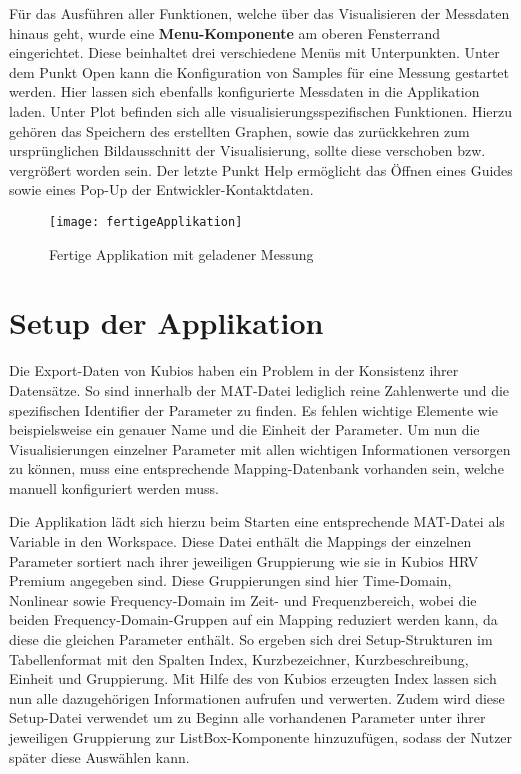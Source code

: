 Für das Ausführen aller Funktionen, welche über das Visualisieren der Messdaten hinaus geht, wurde eine \textbf{Menu-Komponente} am oberen Fensterrand eingerichtet. Diese beinhaltet drei verschiedene Menüs mit Unterpunkten. Unter dem Punkt \glqq Open\grqq{} kann die Konfiguration von Samples für eine Messung gestartet werden. Hier lassen sich ebenfalls konfigurierte Messdaten in die Applikation laden. Unter \glqq Plot\grqq{} befinden sich alle visualisierungsspezifischen Funktionen. Hierzu gehören das Speichern des erstellten Graphen, sowie das zurückkehren zum ursprünglichen Bildausschnitt der Visualisierung, sollte diese verschoben bzw. vergrößert worden sein. Der letzte Punkt \glqq Help\grqq{} ermöglicht das Öffnen eines Guides sowie eines Pop-Up der Entwickler-Kontaktdaten.

\begin{figure}[H]
	\centering
	\texttt{[image: fertigeApplikation]}
	\caption{Fertige Applikation mit geladener Messung}
	\label{fig:fertigeApplikation}
\end{figure}

\section{Setup der Applikation}

Die Export-Daten von Kubios haben ein Problem in der Konsistenz ihrer Datensätze. So sind innerhalb der MAT-Datei lediglich reine Zahlenwerte und die spezifischen Identifier der Parameter zu finden. Es fehlen wichtige Elemente wie beispielsweise ein genauer Name und die Einheit der Parameter. Um nun die Visualisierungen einzelner Parameter mit allen wichtigen Informationen versorgen zu können, muss eine entsprechende Mapping-Datenbank vorhanden sein, welche manuell konfiguriert werden muss.

Die Applikation lädt sich hierzu beim Starten eine entsprechende MAT-Datei als Variable in den Workspace. Diese Datei enthält die Mappings der einzelnen Parameter sortiert nach ihrer jeweiligen Gruppierung wie sie in Kubios HRV Premium angegeben sind. Diese Gruppierungen sind hier Time-Domain, Nonlinear sowie Frequency-Domain im Zeit- und Frequenzbereich, wobei die beiden Frequency-Domain-Gruppen auf ein Mapping reduziert werden kann, da diese die gleichen Parameter enthält. So ergeben sich drei Setup-Strukturen im Tabellenformat mit den Spalten Index, Kurzbezeichner, Kurzbeschreibung, Einheit und Gruppierung. Mit Hilfe des von Kubios erzeugten Index lassen sich nun alle dazugehörigen Informationen aufrufen und verwerten. Zudem wird diese Setup-Datei verwendet um zu Beginn alle vorhandenen Parameter unter ihrer jeweiligen Gruppierung zur ListBox-Komponente hinzuzufügen, sodass der Nutzer später diese Auswählen kann.

